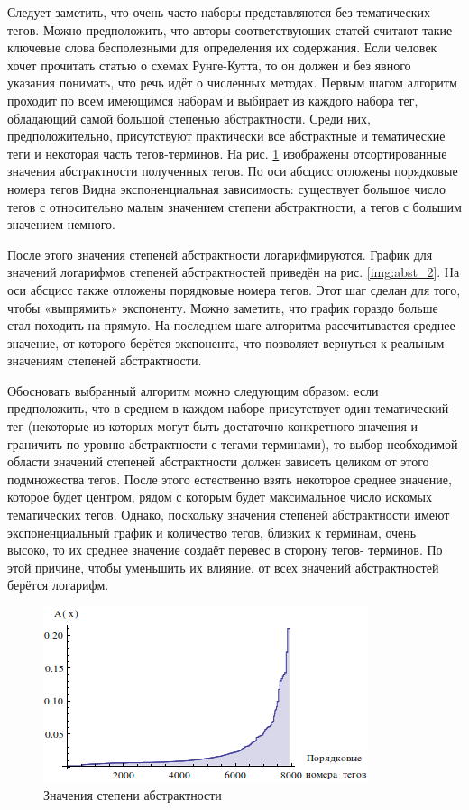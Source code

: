 Следует заметить, что очень часто наборы представляются без тематических тегов. Можно предположить, что авторы соответствующих статей считают такие ключевые слова бесполезными для определения их содержания. Если человек хочет прочитать статью о схемах Рунге-Кутта, то он должен и без явного указания понимать, что речь идёт о численных методах. Первым шагом алгоритм проходит по всем имеющимся наборам и выбирает из каждого набора тег, обладающий самой большой степенью абстрактности. Среди них, предположительно, присутствуют практически все абстрактные и тематические теги и некоторая часть тегов-терминов. На рис. \ref{img:abst_1} изображены отсортированные значения абстрактности полученных тегов. По оси абсцисс отложены порядковые номера тегов Видна экспоненциальная зависимость: существует большое число тегов с относительно малым значением степени абстрактности, а тегов с большим значением немного.

После этого значения степеней абстрактности логарифмируются. График для значений логарифмов степеней абстрактностей приведён на рис. \ref{img:abst_2}. На оси абсцисс также отложены порядковые номера тегов. Этот шаг сделан для того, чтобы «выпрямить» экспоненту. Можно заметить, что график гораздо больше стал походить на прямую. На последнем шаге алгоритма рассчитывается среднее значение, от которого берётся экспонента, что позволяет вернуться к реальным значениям степеней абстрактности.

Обосновать выбранный алгоритм можно следующим образом: если предположить, что в среднем в каждом наборе присутствует один тематический тег (некоторые из которых могут быть достаточно конкретного значения и граничить по уровню абстрактности с тегами-терминами), то выбор необходимой области значений степеней абстрактности должен зависеть целиком от этого подмножества тегов. После этого естественно взять некоторое среднее значение, которое будет центром, рядом с которым будет максимальное число искомых тематических тегов. Однако, поскольку значения степеней абстрактности имеют экспоненциальный график и количество тегов, близких к терминам, очень высоко, то их среднее значение создаёт перевес в сторону тегов- терминов. По этой причине, чтобы уменьшить их влияние, от всех значений абстрактностей берётся логарифм.

\begin{figure}[ht]
  \begin{minipage}[ht]{1.0\linewidth}\centering
    \includegraphics[width=0.5\linewidth]{Dissertation/pics/abstract_words_1}
    \caption{Значения степени абстрактности}
  \end{minipage}
  \label{img:abst_1}
\end{figure}

